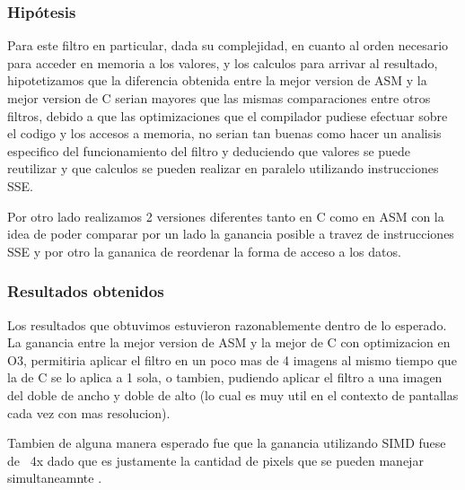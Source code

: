 \subsubsection{Hipótesis}

Para este filtro en particular, dada su complejidad, en cuanto al orden necesario para acceder en memoria a los valores, y los calculos para arrivar al resultado, hipotetizamos que la diferencia obtenida entre la mejor version de ASM y la mejor version de C serian mayores que las mismas comparaciones entre otros filtros, debido a que las optimizaciones que el compilador pudiese efectuar sobre el codigo y los accesos a memoria, no serian tan buenas como hacer un analisis especifico del funcionamiento del filtro y deduciendo que valores se puede reutilizar y que calculos se pueden realizar en paralelo utilizando instrucciones SSE.

Por otro lado realizamos 2 versiones diferentes tanto en C como en ASM con la idea de poder comparar por un lado la ganancia posible a travez de instrucciones SSE y por otro la gananica de reordenar la forma de acceso a los datos.


\subsubsection{Resultados obtenidos}


Los resultados que obtuvimos estuvieron razonablemente dentro de lo esperado. La ganancia entre la mejor version de ASM y la mejor de C con optimizacion en O3, permitiria aplicar el filtro en un poco mas de 4 imagens al mismo tiempo que la de C se lo aplica a 1 sola, o tambien, pudiendo aplicar el filtro a una imagen del doble de ancho y doble de alto (lo cual es muy util en el contexto de pantallas cada vez con mas resolucion). 

Tambien de alguna manera esperado fue que la ganancia utilizando SIMD fuese de ~4x dado que es justamente la cantidad de pixels que se pueden manejar simultaneamnte .

